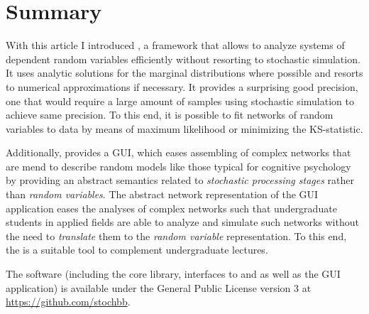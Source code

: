 \section{Summary}
With this article I introduced , a framework that allows to analyze systems of
dependent random variables efficiently without resorting to stochastic simulation. It uses
analytic solutions for the marginal distributions where possible and resorts to numerical
approximations if necessary. It provides a surprising good precision, one that would require a
large amount of samples using stochastic simulation to achieve same precision. To this end, it is
possible to fit networks of random variables to data by means of maximum likelihood or minimizing
the KS-statistic.

Additionally,  provides a GUI, which eases assembling of complex networks that are
mend to describe random models like those typical for cognitive psychology by providing an abstract
semantics related to \emph{stochastic processing stages} rather than \emph{random variables}. The
abstract network representation of the GUI application eases the analyses of complex networks such
that undergraduate students in applied fields are able to analyze and simulate such networks
without the need to \emph{translate} them to the \emph{random variable} representation. To this
end, the  is a suitable tool to complement undergraduate lectures.

The software (including the core library, interfaces to  and  as well
as the GUI application) is available under the General Public License version 3 at 
\href{https://github.com/stochbb}{https://github.com/stochbb}.
